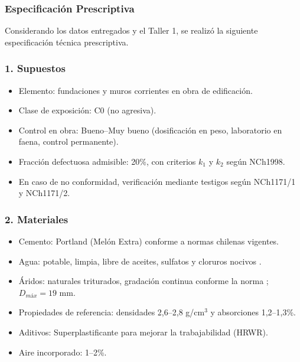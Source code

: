 \subsubsection{Especificación Prescriptiva}

Considerando los datos entregados y el Taller 1, se realizó la siguiente especificación técnica prescriptiva.

\subsubsection*{1. Supuestos}
\begin{itemize}
    \item Elemento: fundaciones y muros corrientes en obra de edificación.
    \item Clase de exposición: C0 (no agresiva).
    \item Control en obra: Bueno–Muy bueno (dosificación en peso, laboratorio en faena, control permanente).
    \item Fracción defectuosa admisible: 20\%, con criterios $k_1$ y $k_2$ según NCh1998.
    \item En caso de no conformidad, verificación mediante testigos según NCh1171/1 y NCh1171/2.
\end{itemize}

\subsubsection*{2. Materiales}
\begin{itemize}
    \item Cemento: Portland (Melón Extra) conforme a normas chilenas vigentes.
    \item Agua: potable, limpia, libre de aceites, sulfatos y cloruros nocivos \citep{INN2022_NCh1498}.
    \item Áridos: naturales triturados, gradación continua conforme la norma \citep{NCh163_Of2013}; $D_{máx} = 19$ mm. 
    \item Propiedades de referencia: densidades 2,6–2,8 g/cm$^3$ y absorciones 1,2–1,3\%.
    \item Aditivos: Superplastificante para mejorar la trabajabilidad (HRWR).
    \item Aire incorporado: 1–2\%.
\end{itemize}

